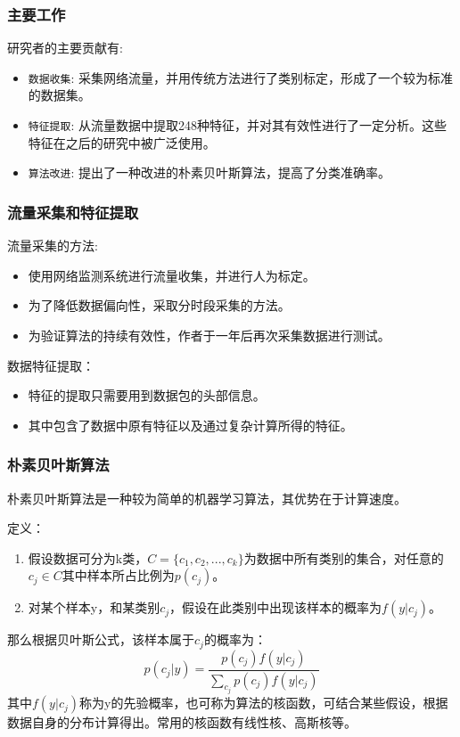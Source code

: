 \documentclass{beamer}
\begin{document}
\begin{frame}[fragile]
	\frametitle{主要工作}
	研究者的主要贡献有:
	\begin{itemize}
		\item \verb|数据收集|: 采集网络流量，并用传统方法进行了类别标定，形成了一个较为标准的数据集。
		\item \verb|特征提取|: 从流量数据中提取248种特征，并对其有效性进行了一定分析。这些特征在之后的研究中被广泛使用。
		\item \verb|算法改进|: 提出了一种改进的朴素贝叶斯算法，提高了分类准确率。
	\end{itemize}
\end{frame}

\begin{frame}[fragile]
	\frametitle{流量采集和特征提取}
	流量采集的方法:
	\begin{itemize}
		\item 使用网络监测系统进行流量收集，并进行人为标定。
		\item 为了降低数据偏向性，采取分时段采集的方法。
		\item 为验证算法的持续有效性，作者于一年后再次采集数据进行测试。
	\end{itemize}
	数据特征提取：
	\begin{itemize}
	    \item 特征的提取只需要用到数据包的头部信息。
	    \item 其中包含了数据中原有特征以及通过复杂计算所得的特征。
	\end{itemize}
\end{frame}

\begin{frame}[fragile]
	\frametitle{朴素贝叶斯算法}
	朴素贝叶斯算法是一种较为简单的机器学习算法，其优势在于计算速度。\\
	\begin{theorem}
	    定义：
		\begin{enumerate}
			\item 假设数据可分为k类，$C = \{c_1, c_2, ... , c_k\}$为数据中所有类别的集合，对任意的$c_j \in C$其中样本所占比例为$p(c_j)$。
			\item 对某个样本y，和某类别$c_j$，假设在此类别中出现该样本的概率为$f(y|c_j)$。
		\end{enumerate}
		那么根据贝叶斯公式，该样本属于$c_j$的概率为：
        $$p(c_j|y) = \frac{p(c_j)f(y|c_j)}{\sum _ {c_j} p(c_j) f(y|c_j)}$$
        其中$f(y|c_j)$称为y的先验概率，也可称为算法的核函数，可结合某些假设，根据数据自身的分布计算得出。常用的核函数有线性核、高斯核等。
	\end{theorem}
\end{frame}
\end{document}

